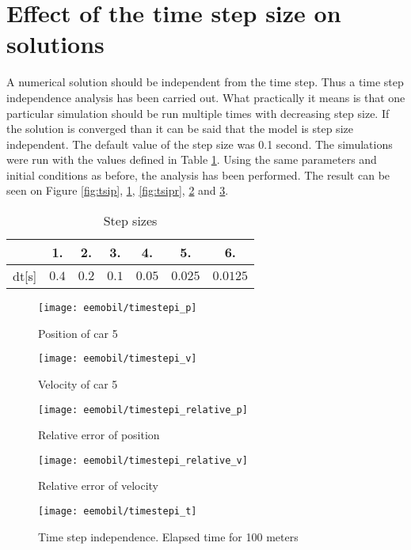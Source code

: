 		\section{Effect of the time step size on solutions}
		A numerical solution should be independent from the time step. Thus a time step independence analysis has been carried out. What practically it means is that one particular simulation should be run multiple times with decreasing step size. If the solution is converged than it can be said that the model is step size independent. The default value of the step size was 0.1 second. The simulations were run with the values defined in Table \ref{tab:timestepsizes}.
		Using the same parameters and initial conditions as before, the analysis has been performed. The result can be seen on Figure \ref{fig:tsip}, \ref{fig:tsiv}, \ref{fig:tsipr}, \ref{fig:tsivr} and \ref{fig:tsit}.
		\begin{table}
			\begin{center}
				\begin{tabular}{ |c||c|c|c|c|c|c|}
					\hline
					&1. & 2. & 3. & 4. & 5. & 6.\\
					\hline
					dt[s]& $0.4$ & $0.2$ & $0.1$ & $0.05$ & $0.025$ & $0.0125$\\
					\hline
				\end{tabular}
			\end{center}
			\caption{Step sizes}
			\label{tab:timestepsizes}
		\end{table}
		\begin{figure}
			\centering
			\begin{minipage}{.5\textwidth}
				\centering
				\texttt{[image: eemobil/timestepi\_p]}
				\caption{Position of car 5}
				\label{fig:tsip}
			\end{minipage}\hfill
			\begin{minipage}{.5\textwidth}
				\centering
				\texttt{[image: eemobil/timestepi\_v]}
				\caption{Velocity of car 5}
				\label{fig:tsiv}
			\end{minipage}
		\end{figure}
		\begin{figure}
			\centering
			\begin{minipage}{.5\textwidth}
				\centering
				\texttt{[image: eemobil/timestepi\_relative\_p]}
				\caption{Relative error of position}
				\label{fig:tsipr}
			\end{minipage}\hfill
			\begin{minipage}{.5\textwidth}
				\centering
				\texttt{[image: eemobil/timestepi\_relative\_v]}
				\caption{Relative error of velocity}
				\label{fig:tsivr}
			\end{minipage}
		\end{figure}
		\begin{figure}
			\centering
			\texttt{[image: eemobil/timestepi\_t]}
			\caption{Time step independence. Elapsed time for 100 meters}
			\label{fig:tsit}
		\end{figure}
